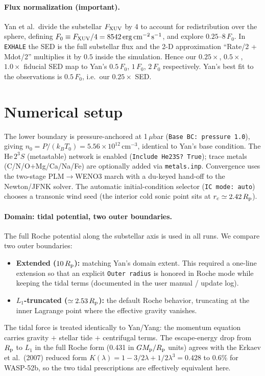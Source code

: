 \documentclass[english,a4paper]{kiseon_memo}
\newcommand{\Rp}{R_{\rm p}}
\newcommand{\FXUV}{F_{\rm XUV}}
\newcommand{\Fo}{F_{0}}
\begin{document}
\paragraph{Flux normalization (important).}
Yan et al.\ divide the substellar $\FXUV$ by 4 to account for redistribution over
the sphere, defining $\Fo\equiv\FXUV/4=8542\,\mathrm{erg\,cm^{-2}\,s^{-1}}$, and
explore $0.25$--$8\,\Fo$. In \texttt{EXHALE} the SED is the full substellar flux
and the 2-D approximation ``Rate/2 + Mdot/2'' multiplies it by $0.5$ inside the
simulation. Hence our $0.25\times$, $0.5\times$, $1.0\times$ fiducial SED map to
Yan's $0.5\,\Fo$, $1\,\Fo$, $2\,\Fo$ respectively. Yan's best fit to the
observations is $0.5\,\Fo$, i.e.\ our $0.25\times$ SED.

\section{Numerical setup}
\label{sec:numerics}
The lower boundary is pressure-anchored at 1\,$\mu$bar (\texttt{Base BC: pressure
1.0}), giving $n_0=P/(k_BT_0)=5.56\times10^{12}\,\mathrm{cm^{-3}}$, identical to
Yan's base condition. The He\,$2^3S$ (metastable) network is enabled
(\texttt{Include He23S? True}); trace metals (C/N/O$+$Mg/Ca/Na/Fe) are optionally
added via \texttt{metals.inp}. Convergence uses the two-stage PLM$\to$WENO3 march
with a du-keyed hand-off to the Newton/JFNK solver. The automatic initial-condition
selector (\texttt{IC mode: auto}) chooses a transonic wind seed (the interior cold
sonic point sits at $r_c\simeq2.42\,\Rp$).

\paragraph{Domain: tidal potential, two outer boundaries.}
The full Roche potential along the substellar axis is used in all runs. We compare
two outer boundaries:
\begin{itemize}
\item \textbf{Extended ($10\,\Rp$):} matching Yan's domain extent. This required a
  one-line extension so that an explicit \texttt{Outer radius} is honored in Roche
  mode while keeping the tidal terms (documented in the user manual / update log).
\item \textbf{$L_1$-truncated ($\simeq2.53\,\Rp$):} the default Roche behavior,
  truncating at the inner Lagrange point where the effective gravity vanishes.
\end{itemize}
The tidal force is treated identically to Yan/Yang: the momentum equation carries
gravity $+$ stellar tide $+$ centrifugal terms. The escape-energy drop from $\Rp$
to $L_1$ in the full Roche form (0.431 in $GM_{\rm p}/\Rp$ units) agrees with the
Erkaev et al.\ (2007) reduced form $K(\lambda)=1-3/2\lambda+1/2\lambda^3=0.428$ to
$0.6\%$ for WASP-52b, so the two tidal prescriptions are effectively equivalent here.
\end{document}
